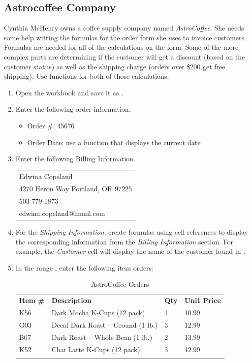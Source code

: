 \subsection{Astrocoffee Company}

Cynthia McHenry owns a coffee supply company named \textit{AstroCoffee}. She needs some help writing the formulas for the order form she uses to invoice customers. Formulas are needed for all of the calculations on the form. Some of the more complex parts are determining if the customer will get a discount (based on the customer status) as well as the shipping charge (orders over \$200 get free shipping). Use  functions for both of those calculations.

\begin{enumerate}
	\item Open the  workbook and save it as .
\item Enter the following order information.
\begin{itemize}
	\item Order \#: 45676
	\item Order Date: use a function that displays the current date
\end{itemize}

\item Enter the following Billing Information.

\begin{tabular}{l}
	\hline
	Edwina Copeland\\
	4270 Heron Way Portland, OR 97225\\
	503-779-1873\\
	edwina.copeland@hmail.com\\
	\hline
\end{tabular}

\item For the \textit{Shipping Information}, create formulas using cell references to display the corresponding information from the \textit{Billing Information} section. For example, the \textit{Customer} cell will display the name of the customer found in .
\item In the range , enter the following item orders:

{\small
	\begin{longtable}{p{0.4in}p{2.10in}p{0.25in}p{0.5in}} %
		\textbf{Item \#} & \textbf{Description} & \textbf{Qty} & \textbf{Unit Price}\endhead
		\hline \\
		K56 & Dark Mocha K-Cups (12 pack) & 1 & 10.99\\
		G03 & Decaf Dark Roast – Ground (1 lb.) & 3 & 12.99\\
		B07 & Dark Roast – Whole Bean (1 lb.) & 2 & 13.99\\
		K52 & Chai Latte K-Cups (12 pack) & 3 & 12.99\\
		\caption{AstroCoffee Orders}
		\label{03:tab02}
	\end{longtable}
}


\end{enumerate}

